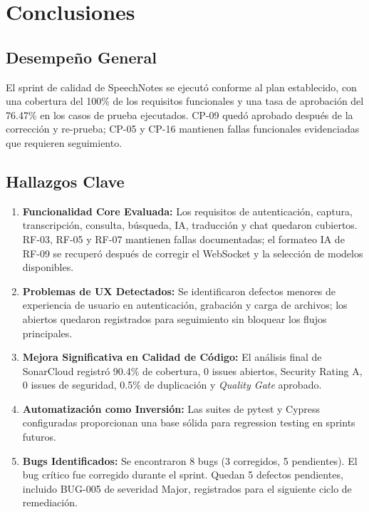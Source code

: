 \chapter{Conclusiones}
\label{sec:conclusiones}

\section{Desempeño General}
\label{sec:desempenio-general}

El sprint de calidad de SpeechNotes se ejecutó conforme al plan establecido, con una cobertura del 100\% de los requisitos funcionales y una tasa de aprobación del 76.47\% en los casos de prueba ejecutados. CP-09 quedó aprobado después de la corrección y re-prueba; CP-05 y CP-16 mantienen fallas funcionales evidenciadas que requieren seguimiento.

\section{Hallazgos Clave}
\label{sec:hallazgos-clave}

\begin{enumerate}
    \item \textbf{Funcionalidad Core Evaluada:} Los requisitos de autenticación, captura, transcripción, consulta, búsqueda, IA, traducción y chat quedaron cubiertos. RF-03, RF-05 y RF-07 mantienen fallas documentadas; el formateo IA de RF-09 se recuperó después de corregir el WebSocket y la selección de modelos disponibles.

    \item \textbf{Problemas de UX Detectados:} Se identificaron defectos menores de experiencia de usuario en autenticación, grabación y carga de archivos; los abiertos quedaron registrados para seguimiento sin bloquear los flujos principales.

    \item \textbf{Mejora Significativa en Calidad de Código:} El análisis final de SonarCloud registró 90.4\% de cobertura, 0 issues abiertos, Security Rating A, 0 issues de seguridad, 0.5\% de duplicación y \textit{Quality Gate} aprobado.

    \item \textbf{Automatización como Inversión:} Las suites de pytest y Cypress configuradas proporcionan una base sólida para regression testing en sprints futuros.

    \item \textbf{Bugs Identificados:} Se encontraron 8 bugs (3 corregidos, 5 pendientes). El bug crítico fue corregido durante el sprint. Quedan 5 defectos pendientes, incluido BUG-005 de severidad Major, registrados para el siguiente ciclo de remediación.
\end{enumerate}

